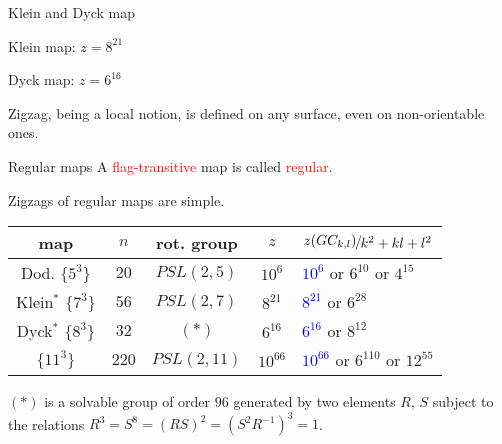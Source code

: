 \documentclass[%
pdf,
colorBG,
slideColor,
]{prosper}
\def\QuotS#1#2{\leavevmode\kern-.0em\raise.2ex\hbox{$#1$}\kern-.1em/\kern-.1em\lower.25ex\hbox{$#2$}}
\begin{document}
\begin{slide}{Klein and Dyck map}
\begin{center}
\setlength{\unitlength}{1cm}
\begin{minipage}[t]{4.0cm}
\epsfxsize=3.9cm
\par
Klein map: $z=8^{21}$
\end{minipage}
\hspace{3cm}
\begin{minipage}[t]{4.0cm}
\epsfxsize=3.9cm
\par
Dyck map: $z=6^{16}$
\end{minipage}
\end{center}

\vspace{3mm}

Zigzag, being a local notion, is defined on any surface, even on non-orientable ones.
\end{slide}




\begin{slide}{Regular maps}
A \textcolor{red}{flag-transitive} map is called \textcolor{red}{regular}.

Zigzags of regular maps are simple.
\vspace{3mm}
\begin{center}
\begin{tabular}{||c|c|c|c|l||}
\hline
\hline
map   &$n$  &rot. group       &$z$    &\multicolumn{1}{|c||}{$\QuotS{z(GC_{k,l})}{k^2+kl+l^2}$}\\
\hline
Dod. $\{5^3\}$   &$20$ &$PSL(2,5)$  &$10^6$         &\textcolor{blue}{$10^6$} or $6^{10}$ or $4^{15}$\\
Klein${}^*$ $\{7^3\}$ &$56$ &$PSL(2,7)$      &$8^{21}$       &\textcolor{blue}{$8^{21}$} or $6^{28}$\\
Dyck${}^*$ $\{8^3\}$  &$32$ &$(*)$   &$6^{16}$       &\textcolor{blue}{$6^{16}$} or $8^{12}$\\
$\{11^3\}$               &$220$&$PSL(2,11)$    &$10^{66}$       &\textcolor{blue}{$10^{66}$} or $6^{110}$ or $12^{55}$\\
\hline
\hline
\end{tabular}
\end{center}
$(*)$ is a solvable group of order $96$ generated by two elements $R$, $S$ subject to the relations $R^3=S^8=(RS)^2=(S^2R^{-1})^3=1$.



\end{slide}
\end{document}
